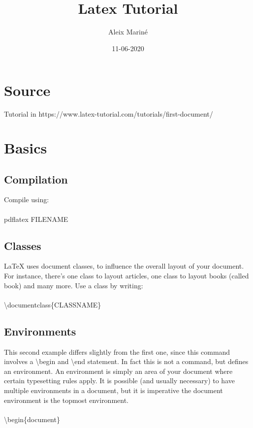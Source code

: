 \documentclass{article}
\title{Latex Tutorial}
\date{11-06-2020}
\author{Aleix Mariné}
\begin{document}
  \maketitle
  \newpage

\section{Source}
Tutorial in https://www.latex-tutorial.com/tutorials/first-document/

\section{Basics}
\subsection{Compilation}
Compile using: 
\paragraph{}
pdflatex FILENAME

\subsection{Classes}
LaTeX uses document classes, to influence the overall layout of your document. For instance, there's one class to layout articles, one class to layout books (called book) and many more. Use a class by writing:
\paragraph{}
\textbackslash documentclass\{CLASSNAME\}

\subsection{Environments}
This second example differs slightly from the first one, since this command involves a \textbackslash begin and  \textbackslash  end statement. In fact this is not a command, but defines an environment. An environment is simply an area of your document where certain typesetting rules apply. It is possible (and usually necessary) to have multiple environments in a document, but it is imperative the document environment is the topmost environment.
\paragraph{}
\textbackslash begin\{document\}
\end{document}
